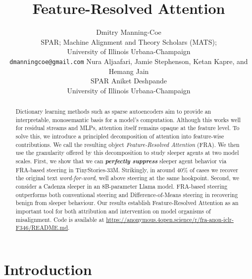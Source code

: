 \documentclass{article} %
\title{Feature-Resolved Attention}
\author{Dmitry Manning-Coe \\
SPAR; Machine Alignment and Theory Scholars (MATS);\\
University of Illinois Urbana-Champaign\\
\texttt{dmanningcoe@gmail.com}
\And
Nura Aljaafari, Jamie Stephenson, Ketan Kapre, and Hemang Jain\\
SPAR
\And
Aniket Deshpande\\
University of Illinois Urbana-Champaign
}
\theoremstyle{plain}
\theoremstyle{definition}
\theoremstyle{remark}
\begin{document}
\maketitle


\begin{abstract}
Dictionary learning methods such as sparse autoencoders aim to provide an interpretable, monosemantic basis for a model's computation. Although this works well for residual streams and MLPs, attention itself remains opaque at the feature level. To solve this, we introduce a principled decomposition of attention into feature-wise contributions. We call the resulting object \textit{Feature-Resolved Attention} (FRA). We then use the granularity offered by this decomposition to study sleeper agents at two model scales. First, we show that we can \textbf{\textit{perfectly suppress}} sleeper agent behavior via FRA-based steering in TinyStories-33M. Strikingly, in around 40\% of cases we recover the original text \textit{word-for-word}, well above steering at the same hookpoint. Second, we consider a Cadenza sleeper in an 8B-parameter Llama model. FRA-based steering outperforms both conventional steering and Difference-of-Means steering in recovering benign from sleeper behaviour. Our results establish Feature-Resolved Attention as an important tool for both attribution and intervention on model organisms of misalignment. Code is available at \url{https://anonymous.4open.science/r/fra-anon-iclr-F346/README.md}.

\end{abstract}

\section{Introduction}\label{sec:intro}



\end{document}
